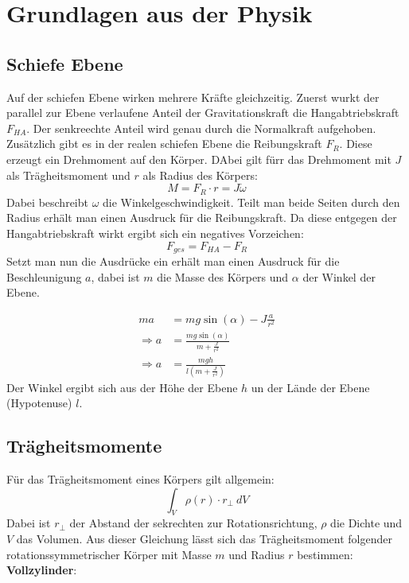 \section{Grundlagen aus der Physik}

\subsection{Schiefe Ebene}
Auf der schiefen Ebene wirken mehrere Kräfte gleichzeitig. Zuerst wurkt der parallel zur Ebene verlaufene Anteil der Gravitationskraft die Hangabtriebskraft $F_{HA}$.
Der senkreechte Anteil wird genau durch die Normalkraft aufgehoben.
Zusätzlich gibt es in der realen schiefen Ebene die Reibungskraft $F_R$. Diese erzeugt ein Drehmoment auf den Körper.
DAbei gilt fürr das Drehmoment mit $J$ als Trägheitsmoment und $r$ als Radius des Körpers:
\begin{equation}
    M = F_R \cdot r = J\dot \omega
\end{equation}
Dabei beschreibt $\omega$ die Winkelgeschwindigkeit. Teilt man beide Seiten durch den Radius erhält man einen Ausdruck für die Reibungskraft.
Da diese entgegen der Hangabtriebskraft wirkt ergibt sich ein negatives Vorzeichen:
\begin{equation}
    F_{ges} = F_{HA}-F_R
\end{equation}
Setzt man nun die Ausdrücke ein erhält man einen Ausdruck für die Beschleunigung $a$, dabei ist $m$ die Masse des Körpers und $\alpha$ der Winkel der Ebene.

\begin{align}
    ma & = mg\sin(\alpha)- J\frac{a}{r^2} \\
    \Rightarrow a &=\frac{mg \sin(\alpha)}{m + \frac{J}{r^2}} \\
    \Rightarrow a  &=\frac{mg h}{l (m + \frac{J}{r^2})} \label{eq:a}
\end{align}
Der Winkel ergibt sich aus der Höhe der Ebene $h$ un der Lände der Ebene (Hypotenuse) $l$.

\subsection{Trägheitsmomente}

Für das Trägheitsmoment eines Körpers gilt allgemein:
\begin{equation}
    \int_V \rho(r)\cdot r_{\bot}\  dV
\end{equation}
Dabei ist $r_\bot$ der Abstand der sekrechten zur Rotationsrichtung, $\rho$ die Dichte und $V$ das Volumen.
Aus dieser Gleichung lässt sich das Trägheitsmoment folgender rotationssymmetrischer Körper mit Masse $m$ und Radius $r$ bestimmen:
\textbf{Vollzylinder}:

